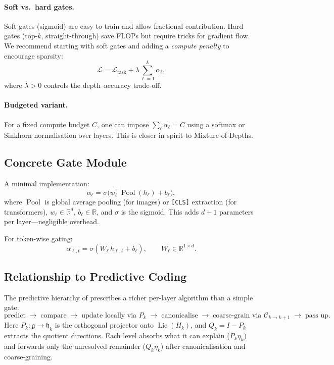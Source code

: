 \documentclass[11pt,a4paper]{article}
\newcommand{\R}{\mathbb{R}}
\newcommand{\cL}{\mathcal{L}}
\newcommand{\fh}{\mathfrak{h}}
\newcommand{\fg}{\mathfrak{g}}
\DeclareMathOperator{\Lie}{Lie}
\DeclareMathOperator{\Pool}{Pool}
\begin{document}
\paragraph{Soft vs.\ hard gates.}
Soft gates (sigmoid) are easy to train and allow fractional
contribution. Hard gates (top-$k$, straight-through) save
FLOPs but require tricks for gradient flow.
We recommend starting with soft gates and adding a
\emph{compute penalty} to encourage sparsity:
\begin{equation}\label{eq:loss}
  \cL = \cL_{\text{task}}
  + \lambda\sum_{\ell=1}^{L}\alpha_\ell,
\end{equation}
where $\lambda>0$ controls the depth--accuracy trade-off.

\paragraph{Budgeted variant.}
For a fixed compute budget $C$, one can impose
$\sum_\ell\alpha_\ell = C$
using a softmax or Sinkhorn normalisation over layers.
This is closer in spirit to Mixture-of-Depths.

\subsection{Concrete Gate Module}\label{sec:gate-module}

A minimal implementation:
\begin{equation}\label{eq:gate-impl}
  \alpha_\ell = \sigma\!\bigl(
    w_\ell^\top \Pool(h_\ell) + b_\ell
  \bigr),
\end{equation}
where $\Pool$ is global average pooling (for images) or
\texttt{[CLS]} extraction (for transformers),
$w_\ell\in\R^d$, $b_\ell\in\R$, and $\sigma$ is the sigmoid.
This adds $d+1$ parameters per layer---negligible overhead.

For token-wise gating:
\begin{equation}
  \alpha_{\ell,t} = \sigma(W_\ell\, h_{\ell,t} + b_\ell),
  \qquad W_\ell\in\R^{1\times d}.
\end{equation}

\subsection{Relationship to Predictive Coding}

The predictive hierarchy of \citet{Ruffini2025compositional}
prescribes a richer per-layer algorithm than a simple gate:
\begin{equation}\label{eq:predcoding}
  \text{predict} \;\to\;
  \text{compare} \;\to\;
  \text{update locally via } P_k \;\to\;
  \text{canonicalise} \;\to\;
  \text{coarse-grain via } \mathcal{C}_{k\to k+1} \;\to\;
  \text{pass up}.
\end{equation}
Here $P_k:\fg\to\fh_k$ is the orthogonal projector onto
$\Lie(H_k)$, and $Q_k = I-P_k$ extracts the quotient directions.
Each level absorbs what it can explain
($P_k\eta_k$) and forwards only the unresolved remainder
($Q_k\eta_k$) after canonicalisation and coarse-graining.
\end{document}

